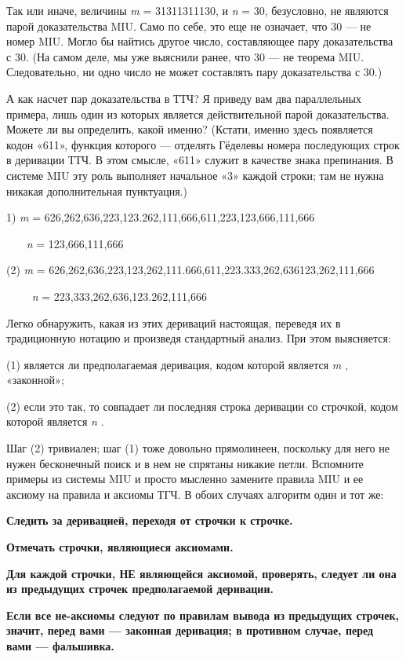 \documentclass[../main.tex]{subfiles}
\begin{document}
Так или иначе, величины \emph{m} = 31311311130, и \emph{n} = 30, безусловно, не являются парой доказательства MIU. Само по себе, это еще не означает, что 30 --- не номер MIU. Могло бы найтись другое число, составляющее пару доказательства с 30. (На самом деле, мы уже выяснили ранее, что 30 --- не теорема MIU. Следовательно, ни одно число не может составлять пару доказательства с 30.)

А как насчет пар доказательства в ТТЧ? Я приведу вам два параллельных примера, лишь один из которых является действительной парой доказательства. Можете ли вы определить, какой именно? (Кстати, именно здесь появляется кодон «611», функция которого --- отделять Гёделевы номера последующих строк в деривации ТТЧ. В этом смысле, «611» служит в качестве знака препинания. В системе MIU эту роль выполняет начальное «3» каждой строки; там не нужна никакая дополнительная пунктуация.)

1) \emph{m} = 626,262,636,223,123.262,111,666,611,223,123,666,111,666

~~~ \emph{n} = 123,666,111,666

(2) \emph{m} = 626,262,636,223,123,262,111.666,611,223.333,262,636123,262,111,666

~~~~ \emph{n} = 223,333,262,636,123.262,111,666

Легко обнаружить, какая из этих дериваций настоящая, переведя их в традиционную нотацию и произведя стандартный анализ. При этом выясняется:

(1) является ли предполагаемая деривация, кодом которой является \emph{m} , «законной»;

(2) если это так, то совпадает ли последняя строка деривации со строчкой, кодом которой является \emph{n} .

Шаг (2) тривиален; шаг (1) тоже довольно прямолинеен, поскольку для него не нужен бесконечный поиск и в нем не спрятаны никакие петли. Вспомните примеры из системы MIU и просто мысленно замените правила MIU и ее аксиому на правила и аксиомы ТГЧ. В обоих случаях алгоритм один и тот же:

\textbf{Следить за деривацией, переходя от строчки к строчке.}

\textbf{Отмечать строчки, являющиеся аксиомами.}

\textbf{Для каждой строчки, НЕ являющейся аксиомой, проверять, следует ли она из предыдущих строчек предполагаемой деривации.}

\textbf{Если все не-аксиомы следуют по правилам вывода из предыдущих строчек, значит, перед вами --- законная деривация; в противном случае, перед вами --- фальшивка.}
\end{document}
